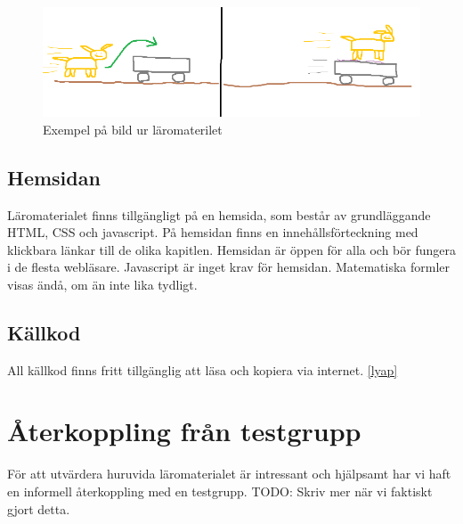 \begin{binge}
\begin{figure}
  \includegraphics[width=\linewidth]{figure/smakprov_bild_laromaterial.png}
  \caption{Exempel på bild ur läromaterilet}
  \label{fig:smakprov_bild_laromaterial}
\end{figure}

\subsection{Hemsidan}

Läromaterialet finns tillgängligt på en hemsida, som består av grundläggande
HTML, CSS och javascript. På hemsidan finns en innehållsförteckning med
klickbara länkar till de olika kapitlen. Hemsidan är öppen för alla och bör
fungera i de flesta webläsare. Javascript är inget krav för hemsidan.
Matematiska formler visas ändå, om än inte lika tydligt.

\subsection{Källkod}

All källkod finns fritt tillgänglig att läsa och kopiera via internet.
\ref{lyap}

\section{Återkoppling från testgrupp}

För att utvärdera huruvida läromaterialet är intressant och hjälpsamt har vi
haft en informell återkoppling med en testgrupp. TODO: Skriv mer när vi
faktiskt gjort detta.

\end{binge}
